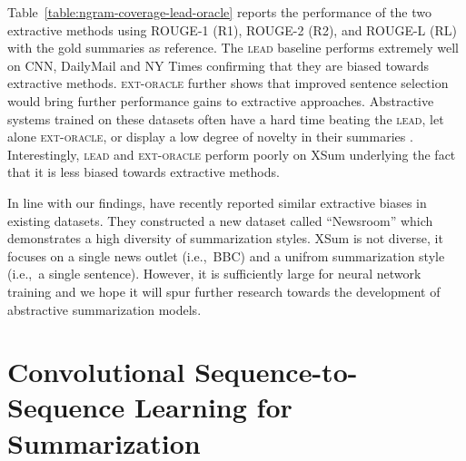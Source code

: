 \documentclass[11pt,a4paper]{article}
\begin{document}
Table~\ref{table:ngram-coverage-lead-oracle} reports the performance
of the two extractive methods using ROUGE-1 (R1), ROUGE-2 (R2), and
ROUGE-L (RL) with the gold summaries as reference. The \textsc{lead}
baseline performs extremely well on CNN, DailyMail and NY
Times confirming that they are biased towards extractive methods.
\textsc{ext-oracle} further shows that improved sentence selection
would bring further performance gains to extractive
approaches. Abstractive systems trained on these datasets often have a
hard time beating the \textsc{lead}, let alone \textsc{ext-oracle}, or
display a low degree of novelty in their summaries
\cite{see-acl17,tanwan-acl17,paulus-socher-arxiv17,Pasunuru-multireward18,asli-multiagent18}.
Interestingly, \textsc{lead} and \textsc{ext-oracle} perform poorly on
XSum underlying the fact that it is less biased towards extractive
methods.





In line with our findings,  have recently
reported similar extractive biases in existing datasets. They
constructed a new dataset called ``Newsroom'' which demonstrates a
high diversity of summarization styles. XSum is not diverse, it
focuses on a single news outlet (i.e.,~BBC) and a unifrom
summarization style (i.e.,~a single sentence). However, it is
sufficiently large for neural network training and we hope it will
spur further research towards the development of abstractive
summarization models.












 
\section{Convolutional Sequence-to-Sequence Learning for Summarization}
\label{sec:topicconvabssum}
\end{document}
